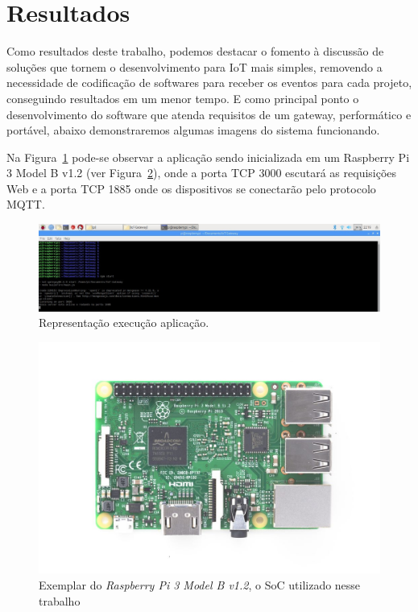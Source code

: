 \section{Resultados}
\label{sec:resultados}

Como resultados deste trabalho, podemos destacar o fomento à discussão de soluções que tornem o desenvolvimento para IoT mais simples, removendo a necessidade de codificação de softwares para receber os eventos para cada projeto, conseguindo resultados em um menor tempo. E como principal ponto o desenvolvimento do software que atenda requisitos de um gateway, performático e portável, abaixo demonstraremos algumas imagens do sistema funcionando.

Na Figura~\ref{fig:raspberryDistroRaspbian} pode-se observar a aplicação sendo inicializada em um Raspberry Pi 3 Model B v1.2 (ver Figura~\ref{fig:raspberryPi3ModelB}), onde a porta TCP 3000 escutará as requisições Web e a porta TCP 1885 onde os dispositivos se conectarão pelo protocolo MQTT.
\begin{figure}[h!]
	\begin{center}
		\includegraphics[width=1.085\textwidth]{./img/raspberryDistroRaspbian}
		\caption{Representação execução aplicação.}
		\label{fig:raspberryDistroRaspbian}
	\end{center}
\end{figure}

\begin{figure}[h!]
	\begin{center}
		\includegraphics[width=1.085\textwidth]{./img/raspberry-pi-3}
		\caption{Exemplar do \textit{Raspberry Pi 3 Model B v1.2}, o SoC utilizado nesse trabalho}
		\label{fig:raspberryPi3ModelB}
	\end{center}
\end{figure}

